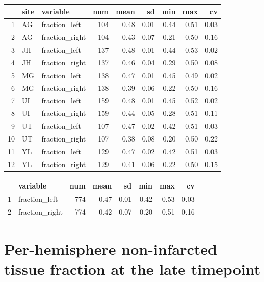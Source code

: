 \documentclass[
]{article}
\begin{document}
\begin{table}[ht]
\centering
\begin{tabular}{rllrrrrrr}
  \hline
 & site & variable & num & mean & sd & min & max & cv \\ 
  \hline
1 & AG & fraction\_left & 104 & 0.48 & 0.01 & 0.44 & 0.51 & 0.03 \\ 
  2 & AG & fraction\_right & 104 & 0.43 & 0.07 & 0.21 & 0.50 & 0.16 \\ 
  3 & JH & fraction\_left & 137 & 0.48 & 0.01 & 0.44 & 0.53 & 0.02 \\ 
  4 & JH & fraction\_right & 137 & 0.46 & 0.04 & 0.29 & 0.50 & 0.08 \\ 
  5 & MG & fraction\_left & 138 & 0.47 & 0.01 & 0.45 & 0.49 & 0.02 \\ 
  6 & MG & fraction\_right & 138 & 0.39 & 0.06 & 0.22 & 0.50 & 0.16 \\ 
  7 & UI & fraction\_left & 159 & 0.48 & 0.01 & 0.45 & 0.52 & 0.02 \\ 
  8 & UI & fraction\_right & 159 & 0.44 & 0.05 & 0.28 & 0.51 & 0.11 \\ 
  9 & UT & fraction\_left & 107 & 0.47 & 0.02 & 0.42 & 0.51 & 0.03 \\ 
  10 & UT & fraction\_right & 107 & 0.38 & 0.08 & 0.20 & 0.50 & 0.22 \\ 
  11 & YL & fraction\_left & 129 & 0.47 & 0.02 & 0.42 & 0.51 & 0.03 \\ 
  12 & YL & fraction\_right & 129 & 0.41 & 0.06 & 0.22 & 0.50 & 0.15 \\ 
   \hline
\end{tabular}
\end{table}
\begin{table}[ht]
\centering
\begin{tabular}{rlrrrrrr}
  \hline
 & variable & num & mean & sd & min & max & cv \\ 
  \hline
1 & fraction\_left & 774 & 0.47 & 0.01 & 0.42 & 0.53 & 0.03 \\ 
  2 & fraction\_right & 774 & 0.42 & 0.07 & 0.20 & 0.51 & 0.16 \\ 
   \hline
\end{tabular}
\end{table}

\hypertarget{per-hemisphere-non-infarcted-tissue-fraction-at-the-late-timepoint}{%
\section{Per-hemisphere non-infarcted tissue fraction at the late
timepoint}\label{per-hemisphere-non-infarcted-tissue-fraction-at-the-late-timepoint}}
\end{document}
